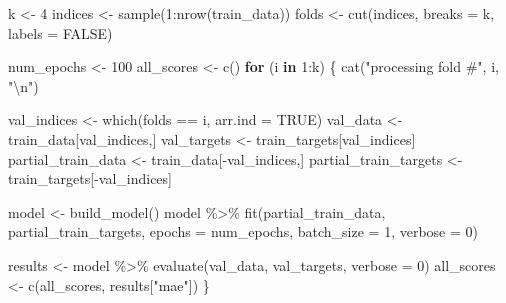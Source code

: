 \documentclass[
]{article}
\newenvironment{Shaded}{\begin{snugshade}}{\end{snugshade}}
\newcommand{\AttributeTok}[1]{\textcolor[rgb]{0.77,0.63,0.00}{#1}}
\newcommand{\ConstantTok}[1]{\textcolor[rgb]{0.00,0.00,0.00}{#1}}
\newcommand{\ControlFlowTok}[1]{\textcolor[rgb]{0.13,0.29,0.53}{\textbf{#1}}}
\newcommand{\DecValTok}[1]{\textcolor[rgb]{0.00,0.00,0.81}{#1}}
\newcommand{\FunctionTok}[1]{\textcolor[rgb]{0.00,0.00,0.00}{#1}}
\newcommand{\NormalTok}[1]{#1}
\newcommand{\OtherTok}[1]{\textcolor[rgb]{0.56,0.35,0.01}{#1}}
\newcommand{\SpecialCharTok}[1]{\textcolor[rgb]{0.00,0.00,0.00}{#1}}
\newcommand{\StringTok}[1]{\textcolor[rgb]{0.31,0.60,0.02}{#1}}
\begin{document}
\begin{Shaded}
\begin{Highlighting}[]
\NormalTok{k }\OtherTok{\textless{}{-}} \DecValTok{4}
\NormalTok{indices }\OtherTok{\textless{}{-}} \FunctionTok{sample}\NormalTok{(}\DecValTok{1}\SpecialCharTok{:}\FunctionTok{nrow}\NormalTok{(train\_data))}
\NormalTok{folds }\OtherTok{\textless{}{-}} \FunctionTok{cut}\NormalTok{(indices, }\AttributeTok{breaks =}\NormalTok{ k, }\AttributeTok{labels =} \ConstantTok{FALSE}\NormalTok{)}

\NormalTok{num\_epochs }\OtherTok{\textless{}{-}} \DecValTok{100} 
\NormalTok{all\_scores }\OtherTok{\textless{}{-}} \FunctionTok{c}\NormalTok{() }
\ControlFlowTok{for}\NormalTok{ (i }\ControlFlowTok{in} \DecValTok{1}\SpecialCharTok{:}\NormalTok{k) \{}
  \FunctionTok{cat}\NormalTok{(}\StringTok{"processing fold \#"}\NormalTok{, i, }\StringTok{"}\SpecialCharTok{\textbackslash{}n}\StringTok{"}\NormalTok{)}
  
\NormalTok{  val\_indices }\OtherTok{\textless{}{-}} \FunctionTok{which}\NormalTok{(folds }\SpecialCharTok{==}\NormalTok{ i, }\AttributeTok{arr.ind =} \ConstantTok{TRUE}\NormalTok{) }
\NormalTok{  val\_data }\OtherTok{\textless{}{-}}\NormalTok{ train\_data[val\_indices,]}
\NormalTok{  val\_targets }\OtherTok{\textless{}{-}}\NormalTok{ train\_targets[val\_indices]}
\NormalTok{  partial\_train\_data }\OtherTok{\textless{}{-}}\NormalTok{ train\_data[}\SpecialCharTok{{-}}\NormalTok{val\_indices,] }
\NormalTok{  partial\_train\_targets }\OtherTok{\textless{}{-}}\NormalTok{ train\_targets[}\SpecialCharTok{{-}}\NormalTok{val\_indices]}
  
\NormalTok{  model }\OtherTok{\textless{}{-}} \FunctionTok{build\_model}\NormalTok{() }
\NormalTok{  model }\SpecialCharTok{\%\textgreater{}\%} \FunctionTok{fit}\NormalTok{(partial\_train\_data, partial\_train\_targets, }
                \AttributeTok{epochs =}\NormalTok{ num\_epochs, }\AttributeTok{batch\_size =} \DecValTok{1}\NormalTok{, }\AttributeTok{verbose =} \DecValTok{0}\NormalTok{)}
  
\NormalTok{  results }\OtherTok{\textless{}{-}}\NormalTok{ model }\SpecialCharTok{\%\textgreater{}\%} \FunctionTok{evaluate}\NormalTok{(val\_data, val\_targets, }\AttributeTok{verbose =} \DecValTok{0}\NormalTok{)}
\NormalTok{  all\_scores }\OtherTok{\textless{}{-}} \FunctionTok{c}\NormalTok{(all\_scores, results[}\StringTok{"mae"}\NormalTok{]) }
\NormalTok{\}}
\end{Highlighting}
\end{Shaded}
\end{document}
